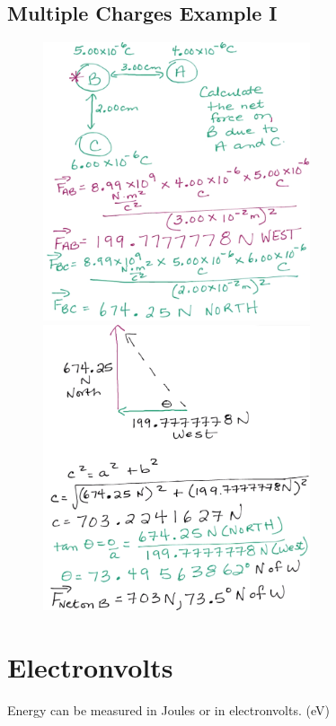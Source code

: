 \documentclass[a4paper,12pt]{article}
\begin{document}
\subsection{Multiple Charges Example I}
\begin{figure}[H]
    \centering
    \includegraphics[width=0.7\textwidth]{multiple}
    \includegraphics[width=0.7\textwidth]{multiple2}
\end{figure}

\section{Electronvolts}
Energy can be measured in Joules or in electronvolts. (\si{\electronvolt})
\end{document}
